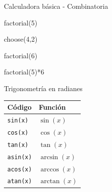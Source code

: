 \documentclass[
  ignorenonframetext,
  aspectratio=169]{beamer}
\newenvironment{Shaded}{\begin{snugshade}}{\end{snugshade}}
\newcommand{\DecValTok}[1]{\textcolor[rgb]{0.00,0.00,0.81}{#1}}
\newcommand{\FunctionTok}[1]{\textcolor[rgb]{0.00,0.00,0.00}{#1}}
\newcommand{\NormalTok}[1]{#1}
\newcommand{\SpecialCharTok}[1]{\textcolor[rgb]{0.00,0.00,0.00}{#1}}
\let\oldverbatim\verbatim
\let\endoldverbatim\endverbatim
\renewenvironment{verbatim}{\tiny\oldverbatim}{\endoldverbatim}
\begin{document}
\begin{frame}[fragile]{Calculadora básica - Combinatoria}
\protect\hypertarget{calculadora-buxe1sica---combinatoria}{}
\begin{Shaded}
\begin{Highlighting}[]
\FunctionTok{factorial}\NormalTok{(}\DecValTok{5}\NormalTok{)}
\end{Highlighting}
\end{Shaded}

\begin{verbatim}
[1] 120
\end{verbatim}

\begin{Shaded}
\begin{Highlighting}[]
\FunctionTok{choose}\NormalTok{(}\DecValTok{4}\NormalTok{,}\DecValTok{2}\NormalTok{)}
\end{Highlighting}
\end{Shaded}

\begin{verbatim}
[1] 6
\end{verbatim}

\begin{Shaded}
\begin{Highlighting}[]
\FunctionTok{factorial}\NormalTok{(}\DecValTok{6}\NormalTok{)}
\end{Highlighting}
\end{Shaded}

\begin{verbatim}
[1] 720
\end{verbatim}

\begin{Shaded}
\begin{Highlighting}[]
\FunctionTok{factorial}\NormalTok{(}\DecValTok{5}\NormalTok{)}\SpecialCharTok{*}\DecValTok{6}
\end{Highlighting}
\end{Shaded}

\begin{verbatim}
[1] 720
\end{verbatim}
\end{frame}

\begin{frame}[fragile]{Trigonometría en radianes}
\protect\hypertarget{trigonometruxeda-en-radianes}{}
\begin{longtable}[]{@{}ll@{}}
\toprule()
Código & Función \\
\midrule()
\endhead
\texttt{sin(x)} & \(\sin(x)\) \\
\texttt{cos(x)} & \(\cos(x)\) \\
\texttt{tan(x)} & \(\tan(x)\) \\
\texttt{asin(x)} & \(\arcsin(x)\) \\
\texttt{acos(x)} & \(\arccos(x)\) \\
\texttt{atan(x)} & \(\arctan(x)\) \\
\bottomrule()
\end{longtable}
\end{frame}
\end{document}
